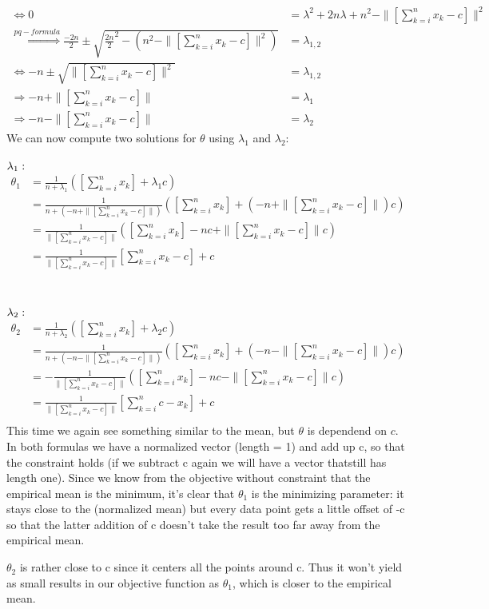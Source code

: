 \documentclass[10pt,a4paper]{article}
\begin{document}
\begin{enumerate}[(a)]
\begin{align*}
    \Leftrightarrow 0 &= \lambda^2 + 2n\lambda + n^2 - \|[\sum_{k = i}^{n}x_k - c]\|^2 \\
    \overset{pq-formula}{\Rightarrow } \frac{-2n}{2} \pm \sqrt{\frac{2n}{2}^2-(n^2 - \|[\sum_{k = i}^{n}x_k - c]\|^2)} &= \lambda_{1,2}\\
    \Leftrightarrow -n \pm \sqrt{\|[\sum_{k = i}^{n}x_k - c]\|^2} &= \lambda_{1,2}\\
    \Rightarrow -n + \|[\sum_{k = i}^{n}x_k - c]\| &= \lambda_1\\
    \Rightarrow-n -  \|[\sum_{k = i}^{n}x_k - c]\| &= \lambda_2
\end{align*}
We can now compute two solutions for $\theta$ using $\lambda_1$ and $\lambda_2$:\\ \\
$\lambda_1:\\$
\begin{align*}
	\theta_1 &= \frac{1}{n+\lambda_1} ([\sum_{k = i}^{n}x_k] + \lambda_1 c)\\
	&=  \frac{1}{n+( -n + \|[\sum_{k = i}^{n}x_k - c]\|)} ([\sum_{k = i}^{n}x_k] +( -n + \|[\sum_{k = i}^{n}x_k - c]\|) c)\\
	&= \frac{1}{\|[\sum_{k = i}^{n}x_k - c]\|}  ([\sum_{k = i}^{n}x_k] -nc + \|[\sum_{k = i}^{n}x_k - c]\| c)\\
	&=  \frac{1}{\|[\sum_{k = i}^{n}x_k - c]\|} [\sum_{k = i}^{n}x_k-c] + c\\
\end{align*}\\ \\
$\lambda_2:\\$
\begin{align*}
	\theta_2 &= \frac{1}{n+\lambda_2} ([\sum_{k = i}^{n}x_k] + \lambda_2 c)\\
	&=  \frac{1}{n+( -n - \|[\sum_{k = i}^{n}x_k - c]\|)} ([\sum_{k = i}^{n}x_k] +( -n - \|[\sum_{k = i}^{n}x_k - c]\|) c)\\
	&= -\frac{1}{\|[\sum_{k = i}^{n}x_k - c]\|}  ([\sum_{k = i}^{n}x_k] -nc - \|[\sum_{k = i}^{n}x_k - c]\| c)\\
	&=  \frac{1}{\|[\sum_{k = i}^{n}x_k - c]\|} [\sum_{k = i}^{n}c-x_k] + c\\
\end{align*}
This time we again see something similar to the mean, but $\theta$ is dependend on $c$. In both formulas we have a normalized vector (length = 1) and add up c, so that the constraint holds (if we subtract c again we will have a vector thatstill has length one). Since we know from the objective without constraint that the empirical mean is the minimum, it's clear that $\theta_1$ is the minimizing parameter: it stays close to the (normalized mean) but every data point gets a little offset of -c so that the latter addition of c doesn't take the result too far away from the empirical mean.

$\theta_2$ is rather close to c since it centers all the points around c. Thus it won't yield as small results in our objective function as $\theta_1$, which is closer to the empirical mean.

\end{enumerate}
\end{document}
